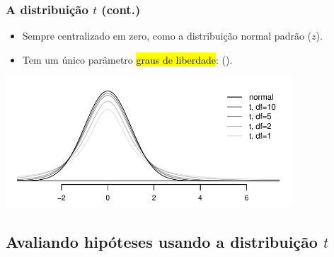\begin{frame}
\frametitle{A distribuição $ t $ (cont.)}

\begin{itemize}
\justifying
\item Sempre centralizado em zero, como a distribuição normal padrão ($ z $).
\justifying
\item Tem um único parâmetro \hl{graus de liberdade}: ().

\end{itemize}

\begin{center}
\includegraphics[width=0.8\textwidth]{5-1_one_t/tDistConvergeToNormalDist.pdf}
\end{center}

\pause
\justifying
{}
\justifying
{}

\end{frame}


\subsection{Avaliando hipóteses usando a distribuição $t$}


